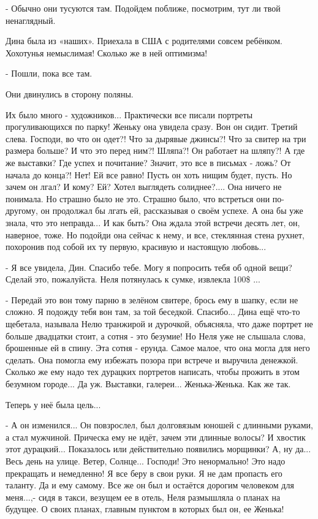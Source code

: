 - Обычно они тусуются там. Подойдем поближе, посмотрим, тут ли твой ненаглядный.

Дина была из «наших». Приехала в США с родителями совсем ребёнком. Хохотунья
немыслимая! Сколько же в ней оптимизма! 

- Пошли, пока все там.

Они двинулись в сторону поляны.

Их было много - художников... Практически все писали портреты прогуливающихся по
парку! Женьку она увидела сразу. Вон он сидит. Третий слева. Господи, во что он
одет?! Что за дырявые джинсы?! Что за свитер на три размера больше? И что это
перед ним?! Шляпа?! Он работает на шляпу?! А где же выставки? Где успех и
почитание? Значит, это все в письмах - ложь? От начала до конца?! Нет! Ей все
равно! Пусть он хоть нищим будет, пусть. Но зачем он лгал? И кому? Ей? Хотел
выглядеть солиднее?.... Она ничего не понимала. Но страшно было не это. Страшно
было, что встреться они по-другому, он продолжал бы лгать ей, рассказывая о своём
успехе. А она бы уже знала, что это неправда... И как быть? Она ждала этой встречи
десять лет, он, наверное, тоже. Но подойди она сейчас к нему, и все, стеклянная
стена рухнет, похоронив под собой их ту первую, красивую и настоящую любовь...

- Я все увидела, Дин. Спасибо тебе. Могу я попросить тебя об одной вещи? Сделай
это, пожалуйста.  Неля потянулась к сумке, извлекла 100\$ ...

- Передай это вон тому парню в зелёном свитере, брось ему в шапку, если не
сложно. Я подожду тебя вон там, за той беседкой. Спасибо...  Дина ещё что-то
щебетала, называла Нелю транжирой и дурочкой, объясняла, что даже портрет не
больше двадцатки стоит, а сотня - это безумие! Но Неля уже не слышала
слова, брошенные ей в спину. Эта сотня - ерунда. Самое малое, что она могла для
него сделать. Она помогла ему избежать позора при встрече и выручила
денежкой. Сколько же ему надо тех дурацких портретов написать, чтобы прожить в
этом безумном городе... Да уж. Выставки, галереи... Женька-Женька. Как же так.

Теперь у неё была цель...

- А он изменился... Он повзрослел, был долговязым юношей с длинными руками, а стал
мужчиной. Прическа ему не идёт, зачем эти длинные волосы? И хвостик этот
дурацкий... Показалось или действительно появились морщинки? А, ну да... Весь день
на улице. Ветер, Солнце... Господи! Это ненормально! Это надо прекращать и
немедленно! Я все беру в свои руки. Я не дам пропасть его таланту. Да и ему
самому. Все же он был и остаётся дорогим человеком для меня...,- сидя в
такси, везущем ее в отель, Неля размышляла о планах на будущее. О своих
планах, главным пунктом в которых был он, ее Женька! 

